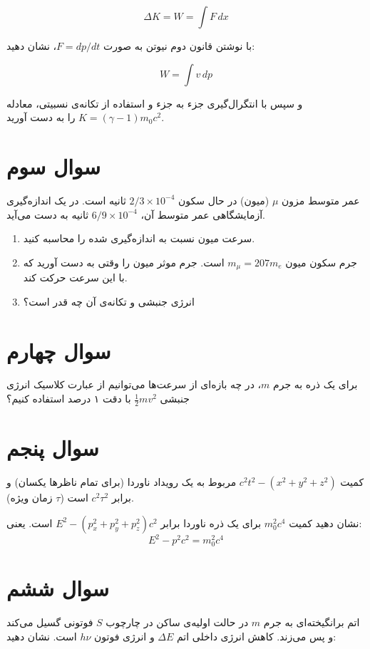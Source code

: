 \documentclass[a4paper,12pt]{article}
\begin{document}
	\[\Delta K = W = \int F \, dx\]
	
	با نوشتن قانون دوم نیوتن به صورت \( F = dp/dt \)، نشان دهید:
	
	\[W = \int v \, dp\]
	
	و سپس با انتگرال‌گیری جزء به جزء و استفاده از تکانه‌ی نسبیتی، معادله \( K = (\gamma - 1)m_0 c^2 \) را به دست آورید.
	
	\section{سوال سوم}
	عمر متوسط مزون \( \mu \) (میون) در حال سکون \( 2/3 \times 10^{-4} \) ثانیه است. در یک اندازه‌گیری آزمایشگاهی عمر متوسط آن، \( 6/9 \times 10^{-4} \) ثانیه به دست می‌آید.
	
	\begin{enumerate}
		\item سرعت میون نسبت به اندازه‌گیری شده را محاسبه کنید.
		\item جرم سکون میون \( m_\mu = 207 m_e \) است. جرم موثر میون را وقتی به دست آورید که با این سرعت حرکت کند.
		\item انرژی جنبشی و تکانه‌ی آن چه قدر است؟
	\end{enumerate}
	
	\section{سوال چهارم}
	برای یک ذره به جرم \( m \)، در چه بازه‌ای از سرعت‌ها می‌توانیم از عبارت کلاسیک انرژی جنبشی \( \frac{1}{2}mv^2 \) با دقت ۱ درصد استفاده کنیم؟
	
	\section{سوال پنجم}
	کمیت \( c^2 t^2 - (x^2 + y^2 + z^2) \) مربوط به یک رویداد ناوردا (برای تمام ناظرها یکسان) و برابر \( c^2 \tau^2 \) است (\( \tau \) زمان ویژه).
	
	نشان دهید کمیت \( m_0^2 c^4 \) برای یک ذره ناوردا برابر \( E^2 - (p_x^2 + p_y^2 + p_z^2)c^2 \) است. یعنی:
	\[
	E^2 - p^2 c^2 = m_0^2 c^4
	\]
	
	\section{سوال ششم}
	اتم برانگیخته‌ای به جرم \( m \) در حالت اولیه‌ی ساکن در چارچوب \( S \) فوتونی گسیل می‌کند و پس می‌زند. کاهش انرژی داخلی اتم \( \Delta E \) و انرژی فوتون \( h\nu \) است. نشان دهید:
	
\end{document}
